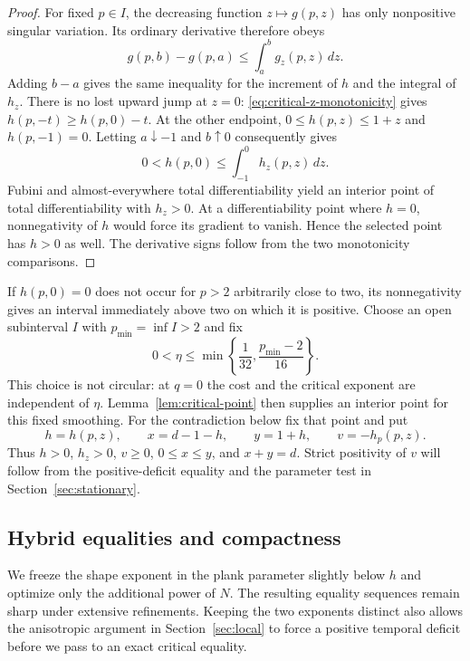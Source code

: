 \begin{proof}
For fixed $p\in I$, the decreasing function $z\mapsto g(p,z)$ has only
nonpositive singular variation.  Its ordinary derivative therefore obeys
\[
 g(p,b)-g(p,a)\le\int_a^b g_z(p,z)\,dz.
\]
Adding $b-a$ gives the same inequality for the increment of $h$ and the
integral of $h_z$.  There is no lost upward jump at $z=0$:
\eqref{eq:critical-z-monotonicity} gives
$h(p,-t)\ge h(p,0)-t$.  At the other endpoint,
$0\le h(p,z)\le1+z$ and $h(p,-1)=0$.
Letting $a\downarrow-1$ and $b\uparrow0$ consequently gives
\[
 0<h(p,0)\le\int_{-1}^0h_z(p,z)\,dz.
\]
Fubini and almost-everywhere total differentiability yield an interior
point of total differentiability with $h_z>0$.  At a differentiability point
where $h=0$, nonnegativity of $h$ would force its gradient to vanish.
Hence the selected point has $h>0$ as well.  The derivative signs follow
from the two monotonicity comparisons.
\end{proof}

If $h(p,0)=0$ does not occur for $p>2$ arbitrarily close to two, its
nonnegativity gives an interval immediately above two on which it is
positive.  Choose an open subinterval $I$ with $p_{\min}=\inf I>2$ and fix
\begin{equation}\label{eq:smoothing-choice}
 0<\eta\le\min\left\{\frac1{32},\frac{p_{\min}-2}{16}\right\}.
\end{equation}
This choice is not circular: at $q=0$ the cost and the critical exponent
are independent of $\eta$.  Lemma~\ref{lem:critical-point} then supplies
an interior point for this fixed smoothing.  For the contradiction below
fix that point and put
\begin{equation}\label{eq:critical-point-notation}
 h=h(p,z),\qquad x=d-1-h,
 \qquad y=1+h,\qquad v=-h_p(p,z).
\end{equation}
Thus $h>0$, $h_z>0$, $v\ge0$, $0\le x\le y$, and $x+y=d$.
Strict positivity of $v$ will follow from the positive-deficit equality and
the parameter test in Section~\ref{sec:stationary}.

\subsection{Hybrid equalities and compactness}

We freeze the shape exponent in the plank parameter slightly below $h$
and optimize only the additional power of $N$. The resulting equality
sequences remain sharp under extensive refinements. Keeping the two
exponents distinct also allows the anisotropic argument in
Section~\ref{sec:local} to force a positive temporal deficit before we
pass to an exact critical equality.

